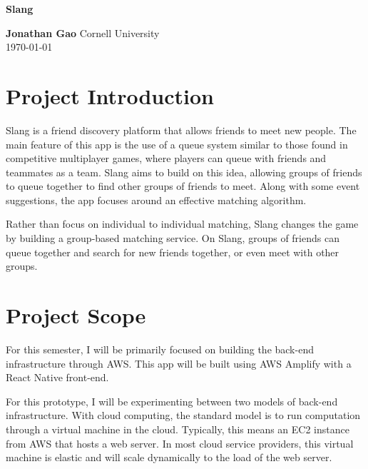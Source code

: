 \documentclass[12pt]{article}
\author{Jonathan Gao}
\def\ind{\hspace*{0.3in}}
\begin{document}
\begin{titlepage}
   \begin{center}
       \vspace*{5cm}
       {\huge\textbf{Slang}}
       \vspace{1.5cm}
       
       \textbf{Jonathan Gao}
       \vfill
       \vspace{0.8cm}
       Cornell University\\
       \today
            
   \end{center}
\end{titlepage}

\section*{Project Introduction}

\ind Slang is a friend discovery platform that allows friends to meet new people. The main feature of this app is the use of a queue system similar to those found in competitive multiplayer games, where players can queue with friends and teammates as a team. Slang aims to build on this idea, allowing groups of friends to queue together to find other groups of friends to meet. Along with some event suggestions, the app focuses around an effective matching algorithm. 

Rather than focus on individual to individual matching, Slang changes the game by building a group-based matching service. On Slang, groups of friends can queue together and search for new friends together, or even meet with other groups.

\section*{Project Scope}

\ind For this semester, I will be primarily focused on building the back-end infrastructure through AWS. This app will be built using AWS Amplify with a React Native front-end. 

For this prototype, I will be experimenting between two models of back-end infrastructure. With cloud computing, the standard model is to run computation through a virtual machine in the cloud. Typically, this means an EC2 instance from AWS that hosts a web server. In most cloud service providers, this virtual machine is elastic and will scale dynamically to the load of the web server. 
\end{document}
